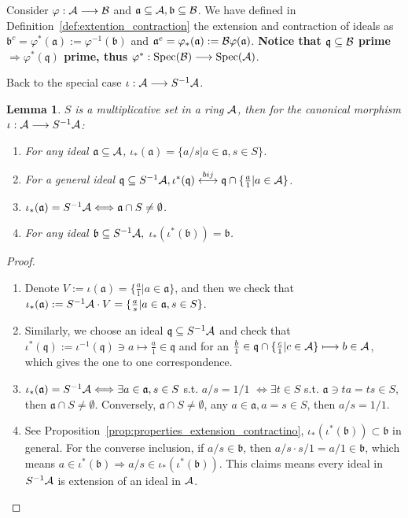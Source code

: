 \documentclass[11pt]{article}
\newtheorem{lemma}[thm]{Lemma}
\newcommand{\sca}{{\mathfrak a}}
\newcommand{\scb}{{\mathfrak b}}
\newcommand{\scq}{\mathfrak q}
\newcommand{\cala}{{\cal A}}
\newcommand{\calb}{{\cal B}}
\newcommand{\Lrta}{\Longrightarrow}
\newcommand{\lrta}{\longrightarrow}
\newcommand{\llrta}{\longleftrightarrow}
\newcommand{\Llrta}{\Longleftrightarrow}
\begin{document}
Consider $\varphi:\cala\lrta\calb$ and $\sca\subseteq \cala, \scb\subseteq \calb$. We have defined in Definition~\ref{def:extention_contraction} the extension and contraction of ideals as $\scb^{c}=\varphi^{*}(\sca):=\varphi^{-1}(\scb)$ and $\sca^{e}=\varphi_*(\sca):=\calb\varphi(\sca)$. \textbf{Notice that 
$\scq\subseteq \calb$ prime $\Lrta \varphi^{*}(\scq)$ prime,
thus $\varphi^*:\text{Spec}(\calb)\lrta \text{Spec}(\cala)$}.

Back to the special case $\iota :\cala\lrta S^{-1}\cala$.
\begin{lemma}\label{lem:prep_localization_iso}
$S$ is a multiplicative set in a ring $\cala$, then for the canonical morphism $\iota:\cala\lrta S^{-1}\cala$:
\begin{enumerate}[label=(\alph*)]
\item For any ideal $\sca\subseteq \cala$, $\iota_*(\sca)=\{a/s|a\in\sca,s\in S\}$.
\item {\color{red} For a general ideal $ \scq\subseteq S^{-1}\cala,\iota^*(\scq)\overset{bij}{\llrta}\scq\cap \{\frac{a}{1}|a\in\cala\}$}.
\item $\iota_*(\sca)= S^{-1}\cala\Llrta\sca\cap S\neq \emptyset$.
\item For any ideal $\scb\subseteq S^{-1}\cala,$ $\iota_{*}(\iota^*(\scb))=\scb$.
\end{enumerate}
\end{lemma}
\begin{proof}\ 
\begin{enumerate}[label=(\alph*)]
\item 
 Denote $V:=\iota(\sca)=\{\frac{a}{1}|a\in\sca\}$, and then we check that $\iota_*(\sca):=S^{-1}\cala\cdot V=\{\frac{a}{s}|a\in\sca,s\in S\}$. 
\item 
 Similarly, we choose an ideal $\scq\subseteq S^{-1}\cala$ and check that $\iota^*(\scq):=\iota^{-1}(\scq)\ni a\longmapsto \frac{a}{1}\in\scq$ and for an $\frac{b}{1}\in\scq\cap\{\frac{c}{1}|c\in\cala\}\longmapsto b\in\cala$, which gives the one to one correspondence.
\item
 $\iota_*(\sca)=S^{-1}\cala\Llrta \exists a\in \sca, s\in S$ s.t. $a/s=1/1$
$\Llrta\exists t\in S$ s.t. $\sca\ni ta=ts\in S$, then $\sca\cap S\neq\emptyset$. Conversely, $\sca\cap S\neq \emptyset$, any $a\in \sca, a=s\in S$, then $a/s=1/1$. 
\item 
See Proposition~\ref{prop:properties_extension_contractino}, $\iota_*(\iota^*(\scb))\subset \scb$ in general. For the converse inclusion, if $a/s\in \scb$, then $a/s\cdot s/1=a/1\in\scb$, which means $a\in \iota^{*}(\scb)\Lrta a/s\in \iota_{*}(\iota^*(\scb))$. This claims means every ideal in $S^{-1}\cala$ is extension of an ideal in $\cala$. 
\end{enumerate} 
\end{proof}
\end{document}
